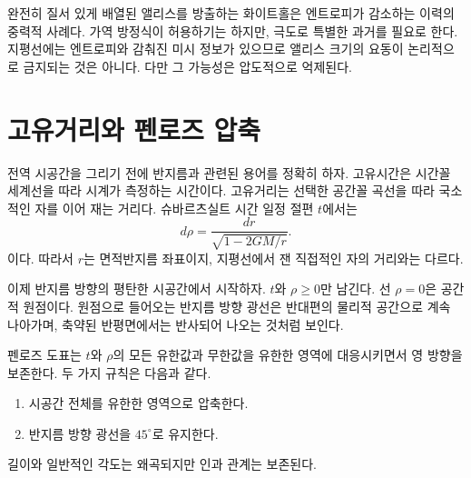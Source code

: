 \begin{classroomqa}
\end{classroomqa}

완전히 질서 있게 배열된 앨리스를 방출하는 화이트홀은 엔트로피가 감소하는 이력의 중력적 사례다. 가역 방정식이 허용하기는 하지만, 극도로 특별한 과거를 필요로 한다. 지평선에는 엔트로피와 감춰진 미시 정보가 있으므로 앨리스 크기의 요동이 논리적으로 금지되는 것은 아니다. 다만 그 가능성은 압도적으로 억제된다.

\begin{classroomqa}
\end{classroomqa}

\section{고유거리와 펜로즈 압축}

전역 시공간을 그리기 전에 반지름과 관련된 용어를 정확히 하자. 고유시간은 시간꼴 세계선을 따라 시계가 측정하는 시간이다. 고유거리는 선택한 공간꼴 곡선을 따라 국소적인 자를 이어 재는 거리다. 슈바르츠실트 시간 일정 절편 \(t\)에서는
\begin{equation}
d\rho=\frac{dr}{\sqrt{1-2GM/r}}.
\label{eq:l04-proper-distance}
\end{equation}
이다. 따라서 \(r\)는 면적반지름 좌표이지, 지평선에서 잰 직접적인 자의 거리와는 다르다.

이제 반지름 방향의 평탄한 시공간에서 시작하자. \(t\)와 \(\rho\ge0\)만 남긴다. 선 \(\rho=0\)은 공간적 원점이다. 원점으로 들어오는 반지름 방향 광선은 반대편의 물리적 공간으로 계속 나아가며, 축약된 반평면에서는 반사되어 나오는 것처럼 보인다.

펜로즈 도표는 \(t\)와 \(\rho\)의 모든 유한값과 무한값을 유한한 영역에 대응시키면서 영 방향을 보존한다. 두 가지 규칙은 다음과 같다.
\begin{enumerate}
\item 시공간 전체를 유한한 영역으로 압축한다.
\item 반지름 방향 광선을 \(45^\circ\)로 유지한다.
\end{enumerate}
길이와 일반적인 각도는 왜곡되지만 인과 관계는 보존된다.

